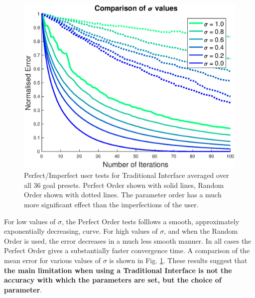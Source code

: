 \documentclass[11pt, oneside]{report}   	%
\begin{document}
\begin{figure}[h]
	\centering
	\includegraphics[width = 5in]{TradInterfaceTests2.eps}
	\caption{Perfect/Imperfect user tests for Traditional Interface averaged over all 36 goal presets. Perfect Order shown with solid lines, Random Order shown with dotted lines. The parameter order has a much more significant effect than the imperfections of the user.}
	\label{fig:TradTest2}
		\vspace{-10pt}
\end{figure}
For low values of $\sigma$, the Perfect Order tests folllows a smooth, approximately exponentially decreasing, curve. For high values of $\sigma$, and when the Random Order is used, the error decreases in a much less smooth manner. In all cases the Perfect Order gives a substantially faster convergence time. A comparison of the mean error for various values of $\sigma$ is shown in Fig. \ref{fig:TradTest2}. These results suggest that \textbf{the main limitation when using a Traditional Interface is not the accuracy with which the parameters are set, but the choice of parameter}.
\vspace{-30pt}
%
\end{document}

